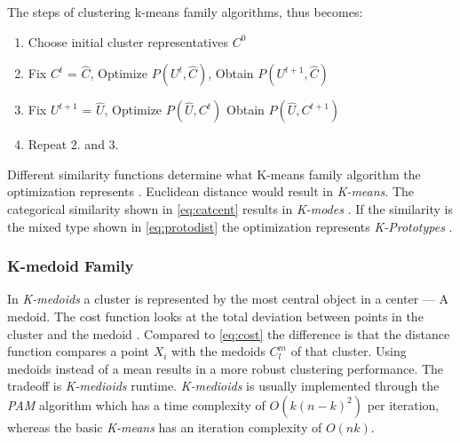 \documentclass[../report.tex]{subfiles}
\begin{document}
The steps of clustering k-means family algorithms, thus becomes:

\begin{enumerate}
  \item Choose initial cluster representatives $C^0$
  \item Fix $C^t$ = $\hat{C}$, Optimize $P(U^{t}, \hat{ C })$, Obtain $P(U^{t + 1}, \hat{ C })$
  \item Fix $U^{t + 1}$ = $\hat{U}$, Optimize $P(\hat{U}, C^t)$ Obtain $P(\hat{ U }, C^{t + 1})$
  \item Repeat 2. and 3.
\end{enumerate}


Different similarity functions determine what K-means family algorithm the optimization represents \cite{huang2005automated}. Euclidean distance would result in \textit{K-means}. The categorical similarity shown in \ref{eq:catcent} results in \textit{K-modes} \cite{Ng1999}. If the similarity is the mixed type shown in \ref{eq:protodist} the optimization represents \textit{K-Prototypes} \cite{Huang97clusteringlarge}. %


\subsubsection{K-medoid Family}
In \textit{K-medoids} a cluster is represented by the most central object in a center --- A medoid. The cost function looks at the total deviation between points in the cluster and the medoid \cite{Ng2002, }. Compared to \ref{eq:cost} the difference is that the distance function compares a point $X_i$ with the medoids $C_l^m$ of that cluster. Using medoids instead of a mean results in a more robust clustering performance. The tradeoff is \textit{K-medioids} runtime. \textit{K-medioids} is usually implemented through the \textit{PAM} algorithm which has a time complexity of $O(k(n-k)^{2})$ per iteration, whereas the basic \textit{K-means} has an iteration complexity of $O(nk)$.
\end{document}
